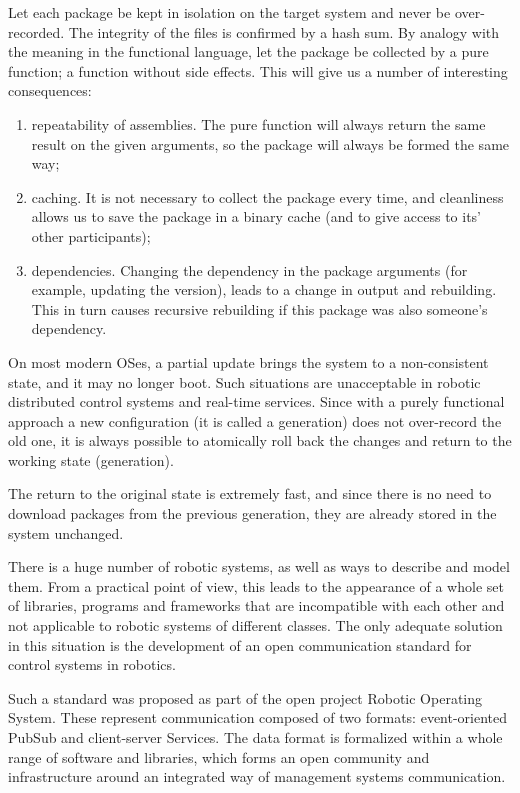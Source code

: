 \documentclass{article}
\begin{document}
Let each package be kept in isolation on the target system and never be over-recorded. The integrity of the files is confirmed by a hash sum. By analogy with the meaning in the functional language, let the package be collected by a pure function; a function without side effects. This will give us a number of interesting consequences:

\begin{enumerate}
\item repeatability of assemblies. The pure function will always return the same result on the given arguments, so the package will always be formed the same way;
\item caching. It is not necessary to collect the package every time, and cleanliness allows us to save the package in a binary cache (and to give access to its' other participants);
\item dependencies. Changing the dependency in the package arguments (for example, updating the version), leads to a change in output and rebuilding. This in turn causes recursive rebuilding if this package was also someone's dependency.
\end{enumerate}

On most modern OSes, a partial update brings the system to a non-consistent state, and it may no longer boot. Such situations are unacceptable in robotic distributed control systems and real-time services. Since with a purely functional approach a new configuration (it is called a generation) does not over-record the old one, it is always possible to atomically roll back the changes and return to the working state (generation).


The return to the original state is extremely fast, and since there is no need to download packages from the previous generation, they are already stored in the system unchanged.



There is a huge number of robotic systems, as well as ways to describe and model them. From a practical point of view, this leads to the appearance of a whole set of libraries, programs and frameworks that are incompatible with each other and not applicable to robotic systems of different classes. The only adequate solution in this situation is the development of an open communication standard for control systems in robotics.

Such a standard was proposed as part of the open project Robotic Operating System. These represent communication composed of two formats: event-oriented PubSub and client-server Services. The data format is formalized within a whole range of software and libraries, which forms an open community and infrastructure around an integrated way of management systems communication.
\end{document}
